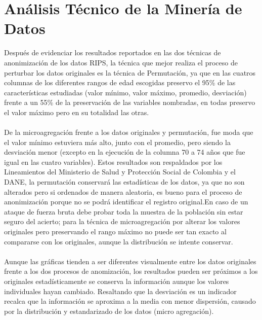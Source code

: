 \documentclass[a4paper,openright,12pt]{book}
\theoremstyle{definition}
\theoremstyle{remark}
\begin{document}
\section{Análisis Técnico de la Minería de Datos}
Después de evidenciar los resultados reportados en las dos técnicas de anonimización de los datos RIPS, la técnica que mejor realiza el proceso de perturbar los datos originales es la técnica de Permutación, ya que en las cuatros columnas de los diferentes rangos de edad escogidas preservo el 95\% de las características estudiadas (valor mínimo, valor máximo, promedio, desviación) frente a un 55\% de la preservación de las variables nombradas, en todas preservo el valor máximo pero en su totalidad las otras.\\\\
De la microagregación frente a los datos originales y permutación, fue moda que el valor mínimo estuviera más alto, junto con el promedio, pero siendo la desviación menor (excepto en la ejecución de la columna 70 a 74 años que fue igual en las cuatro variables). Estos resultados son respaldados por los Lineamientos del Ministerio de Salud y Protección Social de Colombia y el DANE, la permutación conservará las estadísticas de los datos, ya que no son alterados pero si ordenados de manera aleatoria, es bueno para el proceso de anonimización porque no se podrá identificar el registro original.En caso de un ataque de fuerza bruta debe probar toda la muestra de la población sin estar seguro del acierto; para la técnica de microagregación por alterar los valores originales pero preservando el rango máximo no puede ser tan exacto al compararse con los originales, aunque la distribución se intente conservar.\\\\Aunque las gráficas tienden a ser diferentes visualmente entre los datos originales frente a los dos procesos de anomización, los resultados pueden ser próximos a los originales  estadísticamente se conserva la información aunque los valores individuales hayan cambiado. Resaltando que la desviación es un indicador recalca que la información se aproxima a la media con menor dispersión, causado por la distribución y estandarizado de los datos (micro agregación).
\end{document}

